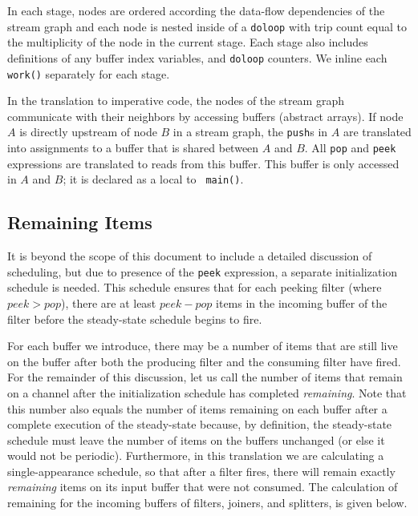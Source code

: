 \documentclass[10pt, letterpaper, onecolumn]{article}
\begin{document}
In each stage, nodes are ordered according the data-flow dependencies
of the stream graph and each node is nested inside of a {\tt doloop}
with trip count equal to the multiplicity of the node in the current
stage.  Each stage also includes definitions of any buffer index
variables, and {\tt doloop} counters.  We inline each {\tt work()}
separately for each stage.  

In the translation to imperative code, the nodes of the stream graph
communicate with their neighbors by accessing buffers (abstract
arrays).  If node $A$ is directly upstream of node $B$ in a stream
graph, the {\tt push}s in $A$ are translated into assignments to a buffer
that is shared between $A$ and $B$.  All {\tt pop} and {\tt peek}
expressions are translated to reads from this buffer.  This buffer is
only accessed in $A$ and $B$; it is declared as a local to {\tt
  main()}.  

\subsection{Remaining Items}
It is beyond the scope of this document to include a detailed
discussion of scheduling, but due to presence of the {\tt peek}
expression, a separate initialization schedule is needed.  This
schedule ensures that for each peeking filter (where $peek > pop$),
there are at least $peek - pop$ items in the incoming buffer of the
filter before the steady-state schedule begins to fire.  

For each buffer we introduce, there may be a number of items that
are still live on the buffer after both the producing filter and the
consuming filter have fired.  For the remainder of this discussion,
let us call the number of items that remain on a channel after the
initialization schedule has completed {\it remaining}.  Note that this
number also equals the number of items remaining on each buffer after
a complete execution of the steady-state because, by definition, the
steady-state schedule must leave the number of items on the buffers
unchanged (or else it would not be periodic).  Furthermore, in this
translation we are calculating a single-appearance schedule, so that
after a filter fires, there will remain exactly {\it remaining} items
on its input buffer that were not consumed.  The calculation of 
remaining for the incoming buffers of filters, joiners, and splitters,
is given below.
\end{document}
